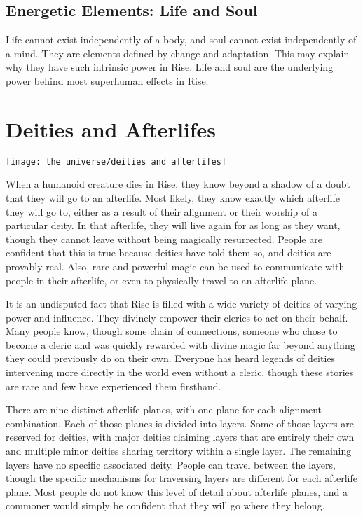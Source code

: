     \subsection{Energetic Elements: Life and Soul}
        Life cannot exist independently of a body, and soul cannot exist independently of a mind.
        They are elements defined by change and adaptation.
        This may explain why they have such intrinsic power in Rise.
        Life and soul are the underlying power behind most superhuman effects in Rise.

\section{Deities and Afterlifes}\label{Deities and Afterlifes}
    \texttt{[image: the universe/deities and afterlifes]}

    When a humanoid creature dies in Rise, they know beyond a shadow of a doubt that they will go to an afterlife.
    Most likely, they know exactly which afterlife they will go to, either as a result of their alignment or their worship of a particular deity.
    In that afterlife, they will live again for as long as they want, though they cannot leave without being magically resurrected.
    People are confident that this is true because deities have told them so, and deities are provably real.
    Also, rare and powerful magic can be used to communicate with people in their afterlife, or even to physically travel to an afterlife plane.

    It is an undisputed fact that Rise is filled with a wide variety of deities of varying power and influence.
    They divinely empower their clerics to act on their behalf.
    Many people know, though some chain of connections, someone who chose to become a cleric and was quickly rewarded with divine magic far beyond anything they could previously do on their own.
    Everyone has heard legends of deities intervening more directly in the world even without a cleric, though these stories are rare and few have experienced them firsthand.

    There are nine distinct afterlife planes, with one plane for each alignment combination.
    Each of those planes is divided into layers.
    Some of those layers are reserved for deities, with major deities claiming layers that are entirely their own and multiple minor deities sharing territory within a single layer.
    The remaining layers have no specific associated deity.
    People can travel between the layers, though the specific mechanisms for traversing layers are different for each afterlife plane.
    Most people do not know this level of detail about afterlife planes, and a commoner would simply be confident that they will go where they belong.

